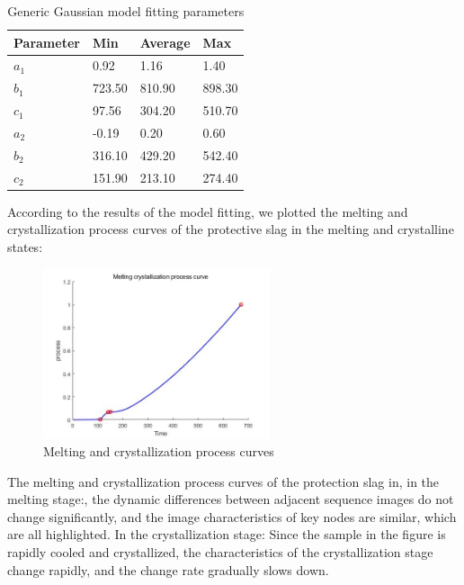 \documentclass{apmcmthesis}
\begin{document}
	\begin{table}[htbp!]
		\centering
	\caption{Generic Gaussian model fitting parameters}
	\begin{tabular}{llll}
		\hline
		\textbf{Parameter} & \textbf{Min} & \textbf{Average} & \textbf{Max} \\ \hline
		\textit{$a_{1}$}   & 0.92         & 1.16             & 1.40         \\
		\textit{$b_{1}$}   & 723.50       & 810.90           & 898.30       \\
		\textit{$c_{1}$}   & 97.56        & 304.20           & 510.70       \\
		\textit{$a_{2}$}   & -0.19        & 0.20             & 0.60         \\
		\textit{$b_{2}$}   & 316.10       & 429.20           & 542.40       \\
		\textit{$c_{2}$}   & 151.90       & 213.10           & 274.40       \\ \hline
	\end{tabular}
\end{table}
According to the results of the model fitting, we plotted the melting and crystallization process curves of the protective slag in the melting and crystalline states:
	\begin{figure}[htbp!]
		\centering
		\includegraphics[height=5cm]{./figures/6-3-3.jpg}
		\caption{Melting and crystallization process curves}
		\label{fig:9}
	\end{figure}
	
	The melting and crystallization process curves of the protection slag in, in the melting stage:, the dynamic differences between adjacent sequence images do not change significantly, and the image characteristics of key nodes are similar, which are all highlighted. In the crystallization stage: Since the sample in the figure is rapidly cooled and crystallized, the characteristics of the crystallization stage change rapidly, and the change rate gradually slows down.
	
\end{document}
